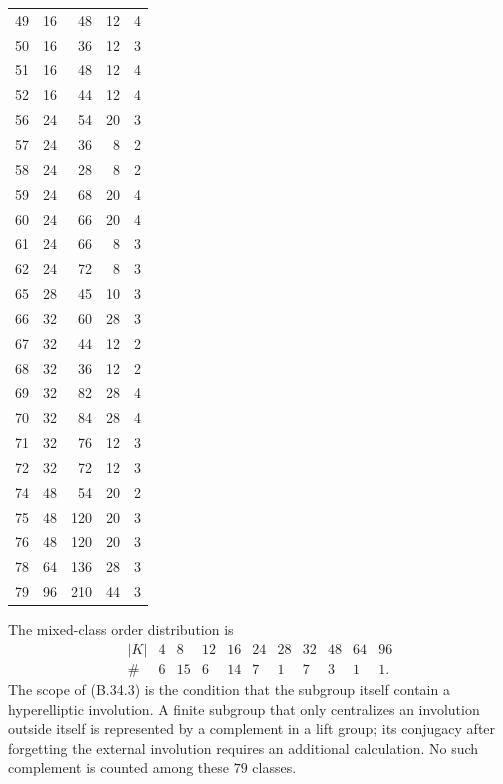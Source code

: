 \begin{longtable}{r|r|r|r|r}
49&16&48&12&4\\
50&16&36&12&3\\
51&16&48&12&4\\
52&16&44&12&4\\
56&24&54&20&3\\
57&24&36&8&2\\
58&24&28&8&2\\
59&24&68&20&4\\
60&24&66&20&4\\
61&24&66&8&3\\
62&24&72&8&3\\
65&28&45&10&3\\
66&32&60&28&3\\
67&32&44&12&2\\
68&32&36&12&2\\
69&32&82&28&4\\
70&32&84&28&4\\
71&32&76&12&3\\
72&32&72&12&3\\
74&48&54&20&2\\
75&48&120&20&3\\
76&48&120&20&3\\
78&64&136&28&3\\
79&96&210&44&3\\
\end{longtable}
The mixed-class order distribution is
\[
\begin{array}{c|rrrrrrrrrr}
 |K|&4&8&12&16&24&28&32&48&64&96\\\hline
 \#&6&15&6&14&7&1&7&3&1&1.
\end{array}                                             \tag{B.34.4}
\]
The scope of (B.34.3) is the condition that the subgroup itself
contain a hyperelliptic involution.  A finite subgroup that only
centralizes an involution outside itself is represented by a
complement in a lift group; its conjugacy after forgetting the
external involution requires an additional calculation.  No such
complement is counted among these $79$ classes.
